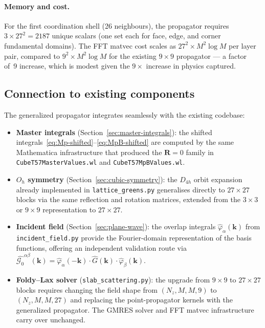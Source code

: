 \documentclass[11pt,a4paper]{article}
\newcommand{\Oh}{O_h}
\newcommand{\bR}{\bm{R}}
\newcommand{\Gprop}{\mathcal{G}_0}
\theoremstyle{plain}
\theoremstyle{definition}
\theoremstyle{remark}
\begin{document}
\paragraph{Memory and cost.}
For the first coordination shell (26 neighbours), the propagator
requires $3 \times 27^2 = 2187$ unique scalars (one set each for
face, edge, and corner fundamental domains).  The FFT matvec cost
scales as $27^2 \times M^2 \log M$ per layer pair, compared to
$9^2 \times M^2 \log M$ for the existing $9 \times 9$ propagator
--- a factor of~9 increase, which is modest given the $9\times$
increase in physics captured.


\subsection{Connection to existing components}
\label{sec:connection}

The generalized propagator integrates seamlessly with the existing
codebase:
\begin{itemize}[nosep]
  \item \textbf{Master integrals}
    (Section~\ref{sec:master-integrals}): the shifted
    integrals~\eqref{eq:Mp-shifted}--\eqref{eq:MpB-shifted} are
    computed by the same Mathematica infrastructure that produced the
    $\bR = 0$ family in \texttt{CubeT57MasterValues.wl} and
    \texttt{CubeT57MpBValues.wl}.
  \item \textbf{$\Oh$ symmetry} (Section~\ref{sec:cubic-symmetry}):
    the $D_{4h}$ orbit expansion already implemented in
    \texttt{lattice\_greens.py} generalises directly to
    $27 \times 27$ blocks via the same reflection and rotation
    matrices, extended from the $3 \times 3$ or $9 \times 9$
    representation to $27 \times 27$.
  \item \textbf{Incident field}
    (Section~\ref{sec:plane-wave}): the overlap integrals
    $\hat{\varphi}_\alpha(\bm{k})$ from
    \texttt{incident\_field.py} provide the Fourier-domain
    representation of the basis functions, offering an independent
    validation route via
    $\hat{\Gprop}^{\alpha\beta}(\bm{k}) =
    \hat{\varphi}_\alpha(-\bm{k}) \cdot
    \hat{G}(\bm{k}) \cdot \hat{\varphi}_\beta(\bm{k})$.
  \item \textbf{Foldy--Lax solver}
    (\texttt{slab\_scattering.py}): the upgrade from $9 \times 9$ to
    $27 \times 27$ blocks requires changing the field shape from
    $(N_z, M, M, 9)$ to $(N_z, M, M, 27)$ and replacing the
    point-propagator kernels with the generalized propagator.  The
    GMRES solver and FFT matvec infrastructure carry over unchanged.
\end{itemize}
\end{document}
